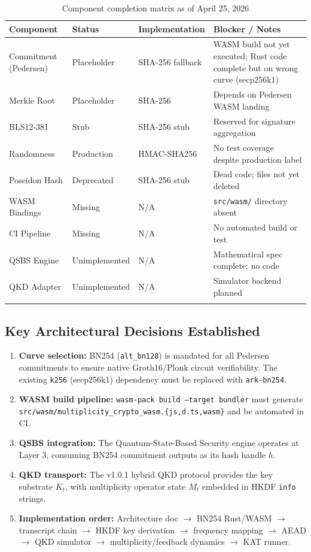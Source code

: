 \documentclass[11pt,letterpaper]{article}
\begin{document}
\begin{longtable}{@{}lllp{5.2cm}@{}}
\toprule
\textbf{Component} & \textbf{Status} & \textbf{Implementation} & \textbf{Blocker / Notes} \\
\midrule
\endhead
Commitment (Pedersen) & Placeholder & SHA-256 fallback & WASM build not yet executed; Rust code complete but on wrong curve (secp256k1) \\
Merkle Root & Placeholder & SHA-256 & Depends on Pedersen WASM landing \\
BLS12-381 & Stub & SHA-256 stub & Reserved for signature aggregation \\
Randomness & Production & HMAC-SHA256 & No test coverage despite production label \\
Poseidon Hash & Deprecated & SHA-256 stub & Dead code; files not yet deleted \\
WASM Bindings & Missing & N/A & \texttt{src/wasm/} directory absent \\
CI Pipeline & Missing & N/A & No automated build or test \\
QSBS Engine & Unimplemented & N/A & Mathematical spec complete; no code \\
QKD Adapter & Unimplemented & N/A & Simulator backend planned \\
\bottomrule
\caption{Component completion matrix as of April 25, 2026}
\end{longtable}

\subsection{Key Architectural Decisions Established}

\begin{enumerate}[leftmargin=*]
  \item \textbf{Curve selection:} BN254 (\texttt{alt\_bn128}) is mandated for all
        Pedersen commitments to ensure native Groth16/Plonk circuit verifiability.
        The existing \texttt{k256} (secp256k1) dependency must be replaced with
        \texttt{ark-bn254}.
  \item \textbf{WASM build pipeline:} \texttt{wasm-pack build --target bundler}
        must generate \texttt{src/wasm/multiplicity\_crypto\_wasm.\{js,d.ts,wasm\}}
        and be automated in CI.
  \item \textbf{QSBS integration:} The Quantum-State-Based Security engine operates
        at Layer 3, consuming BN254 commitment outputs as its hash handle \(h\).
  \item \textbf{QKD transport:} The v1.0.1 hybrid QKD protocol provides the key
        substrate \(K_t\), with multiplicity operator state \(M_t\) embedded in
        HKDF \texttt{info} strings.
  \item \textbf{Implementation order:} Architecture doc \(\to\) BN254 Rust/WASM \(\to\)
        transcript chain \(\to\) HKDF key derivation \(\to\) frequency mapping \(\to\)
        AEAD \(\to\) QKD simulator \(\to\) multiplicity/feedback dynamics \(\to\)
        KAT runner.
\end{enumerate}
\end{document}
